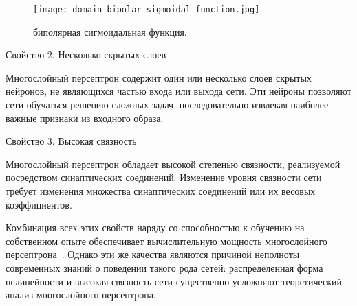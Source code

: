 \begin{figure}[ht]
\centering
  \texttt{[image: domain\_bipolar\_sigmoidal\_function.jpg]}
  \caption{ биполярная сигмоидальная функция. }
  \label{fig:bipolar_sigmoidal_function}
\end{figure}

Свойство 2. Несколько скрытых слоев

Многослойный персептрон содержит один или несколько слоев скрытых нейронов, не являющихся частью входа или выхода сети.
Эти нейроны позволяют сети обучаться решению сложных задач, последовательно извлекая наиболее важные признаки из входного образа.

Свойство 3. Высокая связность

Многослойный персептрон обладает высокой степенью связности, реализуемой посредством синаптических соединений.
Изменение уровня связности сети требует изменения множества синаптических соединений или их весовых коэффициентов.

Комбинация всех этих свойств наряду со способностью к обучению на собственном опыте обеспечивает вычислительную мощность многослойного персептрона~\cite{domain_rosenblatt}.
Однако эти же качества являются причиной неполноты современных знаний о поведении такого рода сетей: распределенная форма нелинейности и высокая связность сети существенно усложняют теоретический анализ многослойного персептрона.
